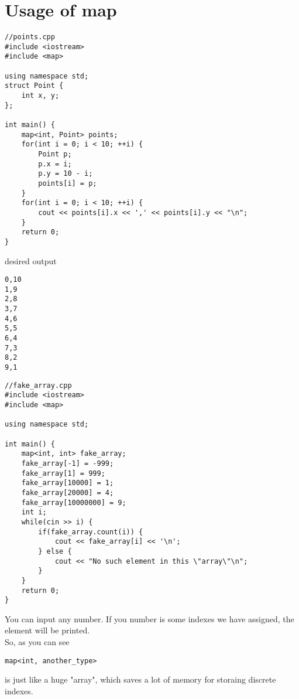 \documentclass{article}
\begin{document}
\section{Usage of map}
\begin{lstlisting}
//points.cpp
#include <iostream>
#include <map>

using namespace std;
struct Point {
    int x, y;
};

int main() {
    map<int, Point> points;
    for(int i = 0; i < 10; ++i) {
        Point p;
        p.x = i;
        p.y = 10 - i;
        points[i] = p;
    }
    for(int i = 0; i < 10; ++i) {
        cout << points[i].x << ',' << points[i].y << "\n";
    }
    return 0;
}
\end{lstlisting}
desired output
\begin{lstlisting}
0,10
1,9
2,8
3,7
4,6
5,5
6,4
7,3
8,2
9,1
\end{lstlisting}
\newpage
\begin{lstlisting}
//fake_array.cpp
#include <iostream>
#include <map>

using namespace std;

int main() {
    map<int, int> fake_array;
    fake_array[-1] = -999;
    fake_array[1] = 999;
    fake_array[10000] = 1;
    fake_array[20000] = 4;
    fake_array[10000000] = 9;
    int i;
    while(cin >> i) {
        if(fake_array.count(i)) {
            cout << fake_array[i] << '\n';
        } else {
            cout << "No such element in this \"array\"\n";
        }
    }
    return 0;
}
\end{lstlisting}
You can input any number. If you number is some indexes we have assigned, the element will be printed.\\
So, as you can see
\begin{lstlisting}
map<int, another_type>
\end{lstlisting}
is just like a huge "array", which saves a lot of memory for storaing discrete indexes.
\end{document}
